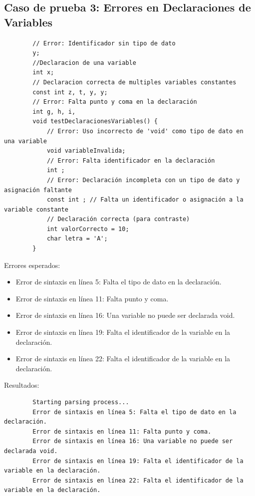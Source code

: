 \documentclass[a4paper,12pt]{article}
\begin{document}
\newpage

\subsection*{Caso de prueba 3: Errores en Declaraciones de Variables}
\begin{flushleft}
	\begin{verbatim}
		// Error: Identificador sin tipo de dato
		y;
		//Declaracion de una variable
		int x;
		// Declaracion correcta de multiples variables constantes
		const int z, t, y, y;
		// Error: Falta punto y coma en la declaración
		int g, h, i, 
		void testDeclaracionesVariables() {
			// Error: Uso incorrecto de 'void' como tipo de dato en una variable
			void variableInvalida;
			// Error: Falta identificador en la declaración
			int ;
			// Error: Declaración incompleta con un tipo de dato y asignación faltante
			const int ; // Falta un identificador o asignación a la variable constante
			// Declaración correcta (para contraste)
			int valorCorrecto = 10;
			char letra = 'A';
		}
	\end{verbatim}
	Errores esperados:
	\begin{itemize}
		\item Error de sintaxis en línea 5: Falta el tipo de dato en la declaración.
		\item Error de sintaxis en línea 11: Falta punto y coma.
		\item Error de sintaxis en línea 16: Una variable no puede ser declarada void.
		\item Error de sintaxis en línea 19: Falta el identificador de la variable en la declaración.
		\item Error de sintaxis en línea 22: Falta el identificador de la variable en la declaración.
	\end{itemize}
	
	Resultados:
	\begin{verbatim}
		Starting parsing process...
		Error de sintaxis en línea 5: Falta el tipo de dato en la declaración.
		Error de sintaxis en línea 11: Falta punto y coma.
		Error de sintaxis en línea 16: Una variable no puede ser declarada void.
		Error de sintaxis en línea 19: Falta el identificador de la variable en la declaración.
		Error de sintaxis en línea 22: Falta el identificador de la variable en la declaración.
	\end{verbatim}
\end{flushleft}
\end{document}
